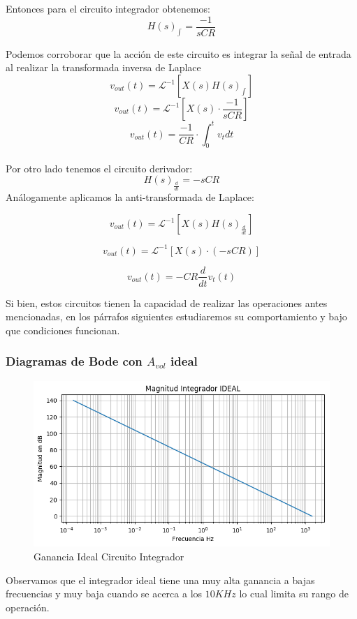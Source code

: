 Entonces para el circuito integrador obtenemos:
$$H(s)_{\int_{}{}} = \frac{-1}{sCR} $$

Podemos corroborar que la acción de este circuito es integrar la señal de entrada al realizar la transformada inversa de Laplace
$$v_{out}(t) = \mathcal{L}^{-1}[X(s)H(s)_{\int_{}{}}]$$
$$v_{out}(t) = \mathcal{L}^{-1}[X(s)\cdot \frac{-1}{sCR}]$$
$$v_{out}(t)= \frac{-1}{CR} \cdot \int_{0}^{t}v_t dt$$            
\\
Por otro lado tenemos el circuito derivador:
$$H(s)_{\frac{d}{dt}}=-sCR$$
Análogamente aplicamos la anti-transformada de Laplace:

$$v_{out}(t) = \mathcal{L}^{-1}[X(s)H(s)_{\frac{d}{dt}}]$$

$$v_{out}(t) = \mathcal{L}^{-1}[X(s)\cdot (-sCR)]$$

$$v_{out}(t)= -CR \frac{d}{dt}v_t(t)$$       

Si bien, estos circuitos tienen la capacidad de realizar las operaciones antes mencionadas, en los párrafos siguientes estudiaremos su comportamiento y bajo que condiciones funcionan.

\subsubsection{Diagramas de Bode con $A_{vol}$ ideal}
\begin{figure}[H]
	\centering
	\includegraphics[width=\textwidth]{Ejercicio4/BODE-IDEAL-MAGNITUD-INTEGRADOR.png}
	\caption{Ganancia Ideal Circuito Integrador}
\end{figure}

Observamos que el integrador ideal tiene una muy alta ganancia a bajas frecuencias y muy baja cuando se acerca a los $10KHz$ lo cual limita su rango de operación.

